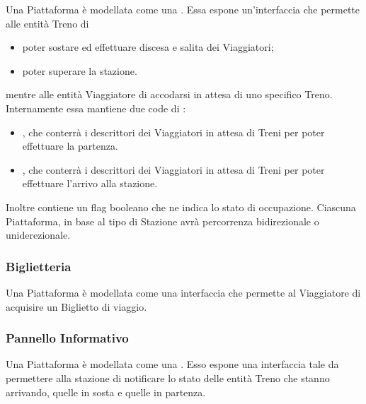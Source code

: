 		Una Piattaforma è modellata come una . Essa espone un'interfaccia che permette alle entità Treno di
		\begin{itemize}
			\item poter sostare ed effettuare discesa e salita dei Viaggiatori;
			\item poter superare la stazione.
		\end{itemize}
	mentre alle entità Viaggiatore di accodarsi in attesa di uno specifico Treno.
		Internamente essa mantiene due code di :
		\begin{itemize}
			\item {}, che conterrà i descrittori dei Viaggiatori in attesa di Treni per poter effettuare la partenza.
			\item {}, che conterrà i descrittori dei Viaggiatori in attesa di Treni per poter effettuare l'arrivo alla stazione.
		\end{itemize}
		Inoltre contiene un flag booleano  che ne indica lo stato di occupazione.
		Ciascuna Piattaforma, in base al tipo di Stazione avrà percorrenza bidirezionale o uniderezionale.
				
		\subsubsection{Biglietteria}
		
		Una Piattaforma è modellata come una interfaccia che permette al Viaggiatore di acquisire un Biglietto di viaggio. 
		
		\subsubsection{Pannello Informativo}
		
		Una Piattaforma è modellata come una . Esso espone una interfaccia tale da permettere alla stazione di notificare lo stato delle entità Treno che stanno arrivando, quelle in sosta e quelle in partenza.
\newpage
